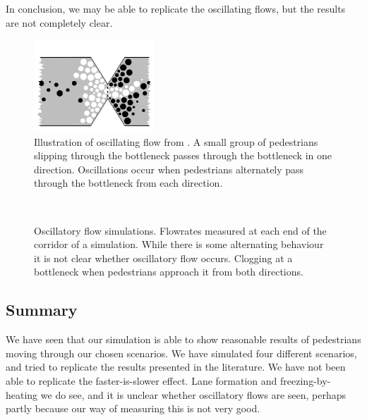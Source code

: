 In conclusion, we may be able to replicate the oscillating flows, but the 
results are not completely clear.
\begin{figure}[h]
    \centering
    \includegraphics[width=0.4\textwidth]{Figures/oscil_flow.png}
    \caption[Illustration of oscillating flow from \cite{oscil}]{Illustration 
    of oscillating flow from \cite{oscil}. A small group of pedestrians 
    slipping through the bottleneck passes through the bottleneck in one 
    direction. Oscillations occur when pedestrians alternately pass through 
    the bottleneck from each direction.}
    \label{fig:oscillitoryflow_litterature}
\end{figure}

\begin{figure}[h]
    \centering
    \\
    
    \caption[Oscillatory flow simulations]{Oscillatory flow simulations. 
     Flowrates measured at each end of the corridor 
    of a simulation. While there is some alternating behaviour it is not clear 
    whether oscillatory flow occurs.  Clogging at a 
    bottleneck when pedestrians approach it from both directions.}
    \label{fig:oscillatory-flow}
\end{figure}

\subsection{Summary}
We have seen that our simulation is able to show reasonable results of 
pedestrians moving through our chosen scenarios. We have simulated four 
different scenarios, and tried to replicate the results presented in the 
literature. We have not been able to replicate the faster-is-slower 
effect. Lane formation and freezing-by-heating we do see, and it is unclear 
whether oscillatory flows are seen, perhaps partly because our way of 
measuring this is not very good.
